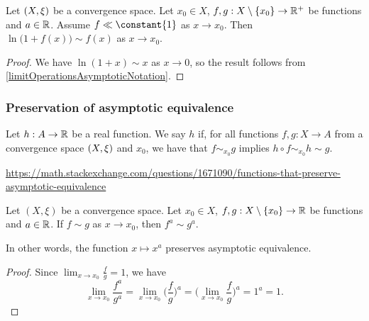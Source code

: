 \begin{lemma}
Let $\sSet{X,\xi}$ be a convergence space. Let $x_0 \in X$, $f,g: X\setminus\{x_0\}\to \mathbb{R}^+$ be functions and $a\in \mathbb{R}$. Assume $f \ll \constant{1}$ as $x\to x_0$. Then $\ln\big(1+f(x)\big) \sim f(x)$ as $x\to x_0$.
\end{lemma}
\begin{proof}
We have $\ln(1+x) \sim x$ as $x\to 0$, so the result follows from \ref{limitOperationsAsymptoticNotation}.
\end{proof}

\subsubsection{Preservation of asymptotic equivalence}
\begin{definition}
Let $h: A\to \mathbb{R}$ be a real function. We say $h$  if, for all functions $f, g: X \to A$ from a convergence space $\sSet{X,\xi}$ and $x_0$, we have that $f\sim_{x_0} g$ implies $h\circ f \sim_{x_0} h\sim g$.
\end{definition}

\url{https://math.stackexchange.com/questions/1671090/functions-that-preserve-asymptotic-equivalence}


\begin{lemma}
Let $(X,\xi)$ be a convergence space. Let $x_0 \in X$, $f,g: X\setminus\{x_0\}\to \mathbb{R}$ be functions and $a\in \mathbb{R}$. If $f \sim g$ as $x\to x_0$, then $f^a \sim g^a$.
\end{lemma}
In other words, the function $x\mapsto x^a$ preserves asymptotic equivalence.
\begin{proof}
Since $\lim_{x\to x_0}\frac{f}{g} = 1$, we have
\[ \lim_{x\to x_0}\frac{f^a}{g^a} = \lim_{x\to x_0}\Big(\frac{f}{g}\Big)^a = \Big(\lim_{x\to x_0}\frac{f}{g}\Big)^a = 1^a = 1. \]
\end{proof}

